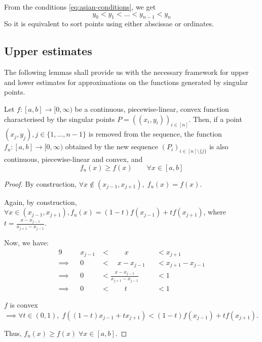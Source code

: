 \begin{rem}
	From the conditions \ref{eq:asian-conditions}, we get
	\begin{equation*}
		y_0 < y_1 < \dots < y_{n-1} < y_n
	\end{equation*}
	So it is equivalent to sort points using either abscissae or ordinates.
\end{rem}



\subsection{Upper estimates}
\label{subsec:asian-upper-estimates}

The following lemmas shall provide us with the necessary framework for upper and lower estimates for approximations on the functions generated by singular points.

\begin{lmm}
	\label{lmm:asian-upper-estimate}
	Let $ f:[a,b] \to [0, \infty) $ be a continuous, piecewise-linear, convex function characterised by the singular points $ P = ( (x_i, y_i) )_{i \in [n]} $. Then, if a point $ (x_j, y_j), j \in \{ 1, \dots, n-1\} $ is removed from the sequence, the function $ f_u: [a,b] \to [0, \infty) $ obtained by the new sequence $ (P_i)_{i \in [n] \setminus \{ j \}} $ is also continuous, piecewise-linear and convex, and
	\begin{equation}
		f_u(x) \ge f(x) \qquad \forall x \in [a,b]
	\end{equation}
\end{lmm}

\begin{proof}
	By construction, $ \forall x \notin ( x_{j-1} , x_{j+1} ), \; f_u(x) = f(x) $.
	
	Again, by construction, $ \forall x \in ( x_{j-1} , x_{j+1} ), f_u(x) = (1-t) f(x_{j-1}) + t f(x_{j+1}) $, where $ t = \frac{ x - x_{j-1} }{ x_{j+1} - x_{j-1} } $.
	
	Now, we have:
	\begin{alignat*}{9}
		          && x_{j-1}  & <  \qquad x          && <  x_{j+1} \\
		\implies  &&       0  & <  \quad x - x_{j-1} && <  x_{j+1} - x_{j-1} \\
		\implies  &&       0  & <  \frac{ x - x_{j-1} }{ x_{j+1} - x_{j-1} } && <  1 \\
		\implies  &&       0  & <  \qquad t          && <  1
	\end{alignat*}
	
	$f$ is convex $\implies \forall t \in (0,1), \; f( (1-t) x_{j-1} + t x_{j+1} ) < (1-t) f(x_{j-1}) + t f(x_{j+1}) $.
	
	Thus, $ f_u(x) \ge f(x) \; \forall x \in [a,b]$.
\end{proof}

